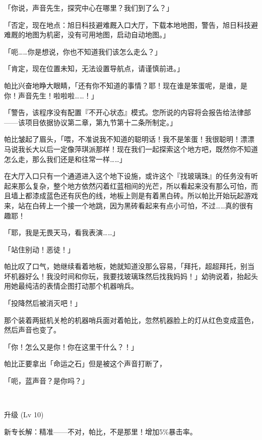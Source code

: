 「你说，声音先生，探究中心在哪里？我们到了么？」

「{\mt 否定，现在地点：旭日科技避难厩入口大厅，下载本地地图，警告，旭日科技避难厩的地图为机密，没有可用地图，启动自动地图。}」

「呃……你是想说，你也不知道我们该怎么走么？」

「{\mt 肯定，现在位置未知，无法设置导航点，请谨慎前进。}」

帕比兴奋地睁大眼睛，「还有你不知道的事情？耶！现在谁是笨蛋呢，是谁，是你！声音先生！啦啦啦……！」

「{\mt 警告，该程序没有配置『不开心状态』模式。您所说的内容将会报告给法律部——该项目依据协议第二章，第九节第十二条所制定。}」

帕比皱起了眉头，「喂，不准说我不知道的聪明话！我不是笨蛋！我很聪明！漂漂马说我长大以后一定像萍琪派那样！现在我们一起探索这个地方吧，既然你不知道怎么走，那么我们还是和往常一样……」

在大厅入口只有一个通道进入这个地下设施，或许这个『找玻璃珠』的任务没有听起来那么复杂，整个地方依然闪着红蓝相间的光芒，所以看起来没有那么可怕，而且墙上都漆成蓝色还有灰色的线，地板上则是有着黑白砖。所以帕比开始玩起游戏来，站在白砖上一个接一个地跳，因为黑砖看起来有点小可怕，不过……真的很有趣耶！

「耶，我是无畏天马，看我表演……」

「站住别动！恶徒！」

帕比叹了口气，她继续看着地板，她就知道没那么容易，「拜托，超超拜托，别当坏机器好么！我没时间和你玩，我要找玻璃珠然后找我妈妈！」幼驹说着，抬起头用她最纯洁的表情企图打动那个机器哨兵。

「投降然后被消灭吧！」

那个装着两挺机关枪的机器哨兵面对着帕比，忽然机器脸上的灯从红色变成蓝色，然后声音也变了。

「你！怎么又是你！你在这里干什么？！」

帕比正要拿出「命运之石」但是被这个声音打断了，

「呃，蓝声音？是你吗？」

~\vfill

\begin{note}
升级 (Lv 10) 

新专长解：精准——不对，帕比，不是那里！增加5\%暴击率。
\end{note}



